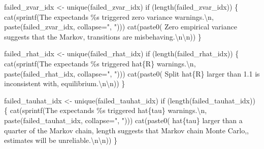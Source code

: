\documentclass[
  letterpaper,
  DIV=11,
  numbers=noendperiod]{scrartcl}
\newenvironment{Shaded}{\begin{snugshade}}{\end{snugshade}}
\newcommand{\AttributeTok}[1]{\textcolor[rgb]{0.40,0.45,0.13}{#1}}
\newcommand{\ControlFlowTok}[1]{\textcolor[rgb]{0.00,0.23,0.31}{#1}}
\newcommand{\FunctionTok}[1]{\textcolor[rgb]{0.28,0.35,0.67}{#1}}
\newcommand{\NormalTok}[1]{\textcolor[rgb]{0.00,0.23,0.31}{#1}}
\newcommand{\OtherTok}[1]{\textcolor[rgb]{0.00,0.23,0.31}{#1}}
\newcommand{\SpecialCharTok}[1]{\textcolor[rgb]{0.37,0.37,0.37}{#1}}
\newcommand{\StringTok}[1]{\textcolor[rgb]{0.13,0.47,0.30}{#1}}
\begin{document}
\begin{Shaded}
\begin{Highlighting}[]
\NormalTok{  failed\_zvar\_idx }\OtherTok{\textless{}{-}} \FunctionTok{unique}\NormalTok{(failed\_zvar\_idx)}
  \ControlFlowTok{if}\NormalTok{ (}\FunctionTok{length}\NormalTok{(failed\_zvar\_idx)) \{ }
    \FunctionTok{cat}\NormalTok{(}\FunctionTok{sprintf}\NormalTok{(}\StringTok{\textquotesingle{}The expectands \%s triggered zero variance warnings.}\SpecialCharTok{\textbackslash{}n}\StringTok{\textquotesingle{}}\NormalTok{,}
                \FunctionTok{paste}\NormalTok{(failed\_zvar\_idx, }\AttributeTok{collapse=}\StringTok{", "}\NormalTok{)))}
    \FunctionTok{cat}\NormalTok{(}\FunctionTok{paste0}\NormalTok{(}\StringTok{\textquotesingle{}  Zero empirical variance suggests that the Markov\textquotesingle{}}\NormalTok{,}
               \StringTok{\textquotesingle{} transitions are misbehaving.}\SpecialCharTok{\textbackslash{}n\textbackslash{}n}\StringTok{\textquotesingle{}}\NormalTok{))}
\NormalTok{  \}}
  
\NormalTok{  failed\_rhat\_idx }\OtherTok{\textless{}{-}} \FunctionTok{unique}\NormalTok{(failed\_rhat\_idx)}
  \ControlFlowTok{if}\NormalTok{ (}\FunctionTok{length}\NormalTok{(failed\_rhat\_idx)) \{}
    \FunctionTok{cat}\NormalTok{(}\FunctionTok{sprintf}\NormalTok{(}\StringTok{\textquotesingle{}The expectands \%s triggered hat\{R\} warnings.}\SpecialCharTok{\textbackslash{}n}\StringTok{\textquotesingle{}}\NormalTok{,}
                \FunctionTok{paste}\NormalTok{(failed\_rhat\_idx, }\AttributeTok{collapse=}\StringTok{", "}\NormalTok{)))}
    \FunctionTok{cat}\NormalTok{(}\FunctionTok{paste0}\NormalTok{(}\StringTok{\textquotesingle{}  Split hat\{R\} larger than 1.1 is inconsistent with\textquotesingle{}}\NormalTok{, }
               \StringTok{\textquotesingle{} equilibrium.}\SpecialCharTok{\textbackslash{}n\textbackslash{}n}\StringTok{\textquotesingle{}}\NormalTok{))}
\NormalTok{  \}}
  
\NormalTok{  failed\_tauhat\_idx }\OtherTok{\textless{}{-}} \FunctionTok{unique}\NormalTok{(failed\_tauhat\_idx)}
  \ControlFlowTok{if}\NormalTok{ (}\FunctionTok{length}\NormalTok{(failed\_tauhat\_idx)) \{}
    \FunctionTok{cat}\NormalTok{(}\FunctionTok{sprintf}\NormalTok{(}\StringTok{\textquotesingle{}The expectands \%s triggered hat\{tau\} warnings.}\SpecialCharTok{\textbackslash{}n}\StringTok{\textquotesingle{}}\NormalTok{,}
                \FunctionTok{paste}\NormalTok{(failed\_tauhat\_idx, }\AttributeTok{collapse=}\StringTok{", "}\NormalTok{)))}
    \FunctionTok{cat}\NormalTok{(}\FunctionTok{paste0}\NormalTok{(}\StringTok{\textquotesingle{}  hat\{tau\} larger than a quarter of the Markov chain\textquotesingle{}}\NormalTok{,}
               \StringTok{\textquotesingle{} length suggests that Markov chain Monte Carlo,\textquotesingle{}}\NormalTok{,}
               \StringTok{\textquotesingle{} estimates will be unreliable.}\SpecialCharTok{\textbackslash{}n\textbackslash{}n}\StringTok{\textquotesingle{}}\NormalTok{))}
\NormalTok{  \}}
  

\end{Highlighting}
\end{Shaded}
\end{document}
